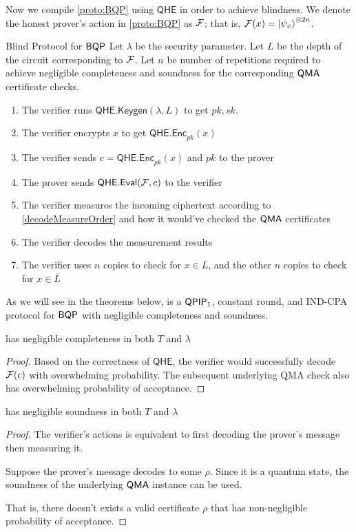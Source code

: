 Now we compile \cref{proto:BQP} using $\mathsf{QHE}$ in order to achieve blindness.
We denote the honest prover's action in \cref{proto:BQP} as $\mathcal{F}$; that is, $\mathcal{F}(x)=\ket{\psi_x}^{\otimes 2n}$.

\begin{protocol}{Blind Protocol for $\operatorname{\mathsf{BQP}}$}
	\label{proto:BlindBQP}
	Let $\lambda$ be the security parameter.
	Let $L$ be the depth of the circuit corresponding to $\mathcal{F}$.
	Let $n$ be number of repetitions required to achieve negligible completeness and soundness for the corresponding $\operatorname{\mathsf{QMA}}$ certificate checks.
	\begin{enumerate}
		\item The verifier runs $\mathsf{QHE.Keygen}(\lambda, L)$ to get $pk, sk$.
		\item The verifier encrypts $x$ to get $\mathsf{QHE.Enc}_{pk}(x)$
		\item The verifier sends $c=\mathsf{QHE.Enc}_{pk}(x)$ and $pk$ to the prover
		\item The prover sends $\mathsf{QHE.Eval}(\mathcal{F}, c)$ to the verifier
		\item The verifier measures the incoming ciphertext according to \cref{decodeMeasureOrder} and how it would've checked the $\operatorname{\mathsf{QMA}}$ certificates 
		\item The verifier decodes the measurement results
		\item The verifier uses $n$ copies to check for $x\in L$, and the other $n$ copies to check for $x\in\overline{L}$
	\end{enumerate}
\end{protocol}

As we will see in the theorems below,  is a $\operatorname{\mathsf{QPIP}}_1$, constant round, and IND-CPA protocol for $\operatorname{\mathsf{BQP}}$ with negligible completeness and soundness.

\begin{thm}
	 has negligible completeness in both $T$ and $\lambda$
\end{thm}
\begin{proof}
	Based on the correctness of $\mathsf{QHE}$, the verifier would successfully decode $\mathcal{F}(c)$ with overwhelming probability.
	The subsequent underlying QMA check also has overwhelming probability of acceptance.
\end{proof}

\begin{thm}
	 has negligible soundness in both $T$ and $\lambda$
\end{thm}
\begin{proof}
	The verifier's actions is equivalent to first decoding the prover's message then measuring it.

	Suppose the prover's message decodes to some $\rho$. Since it is a quantum state, the soundness of the underlying $\operatorname{\mathsf{QMA}}$ instance can be used.
	
	That is, there doesn't exists a valid certificate $\rho$ that has non-negligible probability of acceptance.
\end{proof}

